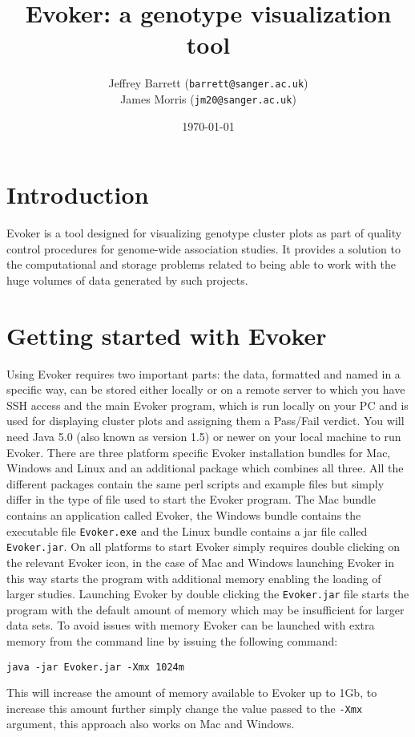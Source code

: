 \documentclass{article}
\title{Evoker: a genotype visualization tool}
\author{Jeffrey Barrett (\texttt{barrett@sanger.ac.uk})\\
James Morris (\texttt{jm20@sanger.ac.uk})}
\date{\today}
\begin{document}
\maketitle

\section{Introduction}

Evoker is a tool designed for visualizing genotype cluster plots as part of quality control procedures for genome-wide association studies. It provides a solution to the computational and storage problems related to being able to work with the huge volumes of data generated by such projects.

\section{Getting started with Evoker}

Using Evoker requires two important parts: the data, formatted and named in a specific way, can be stored either locally or on a remote server to which you have SSH access and the main Evoker program, which is run locally on your PC and is used for displaying cluster plots and assigning them a Pass/Fail verdict. You will need Java 5.0 (also known as version 1.5) or newer on your local machine to run Evoker. There are three platform specific Evoker installation bundles for Mac, Windows and Linux and an additional package which combines all three. All the different packages contain the same perl scripts and example files but simply differ in the type of file used to start the Evoker program. The Mac bundle contains an application called Evoker, the Windows bundle contains the executable file \texttt{Evoker.exe} and the Linux bundle contains a jar file called \texttt{Evoker.jar}. On all platforms to start Evoker simply requires double clicking on the relevant Evoker icon, in the case of Mac and Windows launching Evoker in this way starts the program with additional memory enabling the loading of larger studies. Launching Evoker by double clicking the \texttt{Evoker.jar} file starts the program with the default amount of memory which may be insufficient for larger data sets. To avoid issues with memory Evoker can be launched with extra memory from the command line by issuing the following command:
\begin{verbatim}
java -jar Evoker.jar -Xmx 1024m 
\end{verbatim}
This will increase the amount of memory available to  Evoker up to 1Gb, to increase this amount further simply change the value passed to the \texttt{-Xmx} argument, this approach also works on Mac and Windows.
\end{document}
